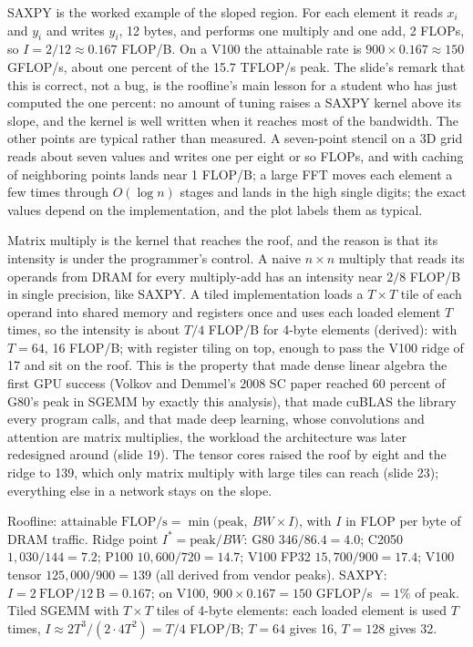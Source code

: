 \documentclass[11pt,letterpaper]{article}
\newenvironment{formulas}{\begin{tcolorbox}[formulabox]}{\end{tcolorbox}}
\begin{document}
SAXPY is the worked example of the sloped region. For each element it reads $x_i$ and $y_i$ and writes $y_i$, 12 bytes, and performs one multiply and one add, 2 FLOPs, so $I = 2/12 \approx 0.167$ FLOP/B. On a V100 the attainable rate is $900 \times 0.167 \approx 150$ GFLOP/s, about one percent of the 15.7 TFLOP/s peak. The slide's remark that this is correct, not a bug, is the roofline's main lesson for a student who has just computed the one percent: no amount of tuning raises a SAXPY kernel above its slope, and the kernel is well written when it reaches most of the bandwidth. The other points are typical rather than measured. A seven-point stencil on a 3D grid reads about seven values and writes one per eight or so FLOPs, and with caching of neighboring points lands near 1 FLOP/B; a large FFT moves each element a few times through $O(\log n)$ stages and lands in the high single digits; the exact values depend on the implementation, and the plot labels them as typical.

Matrix multiply is the kernel that reaches the roof, and the reason is that its intensity is under the programmer's control. A naive $n \times n$ multiply that reads its operands from DRAM for every multiply-add has an intensity near $2/8$ FLOP/B in single precision, like SAXPY. A tiled implementation loads a $T \times T$ tile of each operand into shared memory and registers once and uses each loaded element $T$ times, so the intensity is about $T/4$ FLOP/B for 4-byte elements (derived): with $T = 64$, 16 FLOP/B; with register tiling on top, enough to pass the V100 ridge of 17 and sit on the roof. This is the property that made dense linear algebra the first GPU success (Volkov and Demmel's 2008 SC paper reached 60 percent of G80's peak in SGEMM by exactly this analysis), that made cuBLAS the library every program calls, and that made deep learning, whose convolutions and attention are matrix multiplies, the workload the architecture was later redesigned around (slide 19). The tensor cores raised the roof by eight and the ridge to 139, which only matrix multiply with large tiles can reach (slide 23); everything else in a network stays on the slope.

\begin{formulas}
Roofline: $\text{attainable FLOP/s} = \min\bigl(\text{peak},\ BW \times I\bigr)$, with $I$ in FLOP per byte of DRAM traffic. Ridge point $I^\ast = \text{peak}/BW$: G80 $346/86.4 = 4.0$; C2050 $1{,}030/144 = 7.2$; P100 $10{,}600/720 = 14.7$; V100 FP32 $15{,}700/900 = 17.4$; V100 tensor $125{,}000/900 = 139$ (all derived from vendor peaks). SAXPY: $I = 2\ \text{FLOP}/12\ \text{B} = 0.167$; on V100, $900 \times 0.167 = 150$ GFLOP/s $= 1\%$ of peak. Tiled SGEMM with $T \times T$ tiles of 4-byte elements: each loaded element is used $T$ times, $I \approx 2T^3 / (2 \cdot 4 T^2) = T/4$ FLOP/B; $T = 64$ gives 16, $T = 128$ gives 32.
\end{formulas}
\end{document}

